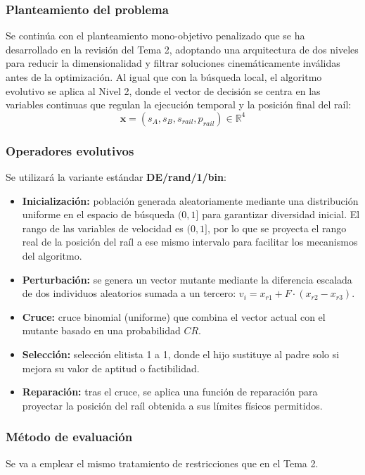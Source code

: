 \subsubsection*{Planteamiento del problema}
Se continúa con el planteamiento mono-objetivo penalizado que se ha desarrollado en la 
revisión del Tema 2, adoptando una
arquitectura de dos niveles para reducir la dimensionalidad y filtrar soluciones
cinemáticamente inválidas antes de la optimización. Al igual que con la búsqueda local,
el algoritmo evolutivo se aplica al Nivel 2, donde el vector de decisión se centra en las 
variables continuas que regulan la ejecución temporal y la posición final del raíl: 
\begin{equation}
    \mathbf{x} = (s_A, s_B, s_{rail}, p_{rail}) \in \mathbb{R}^4
\end{equation}

\subsubsection*{Operadores evolutivos}
Se utilizará la variante estándar \textbf{DE/rand/1/bin}:
\begin{itemize}
    \item \textbf{Inicialización:} población generada aleatoriamente mediante una 
distribución uniforme en el espacio de búsqueda $(0, 1]$ para garantizar diversidad inicial. 
El rango de las variables de velocidad es $(0, 1]$, por lo que se proyecta el rango real de la
posición del raíl a ese mismo intervalo para facilitar los mecanismos del algoritmo.
    \item \textbf{Perturbación:} se genera un vector mutante mediante la 
diferencia escalada de dos individuos aleatorios sumada a un tercero: $v_i = x_{r1} + F \cdot (x_{r2} - x_{r3})$.
    \item \textbf{Cruce:} cruce binomial (uniforme) que combina el vector 
actual con el mutante basado en una probabilidad $CR$.
    \item \textbf{Selección:} selección elitista 1 a 1, donde el hijo 
sustituye al padre solo si mejora su valor de aptitud o factibilidad.
    \item \textbf{Reparación:} tras el cruce, se aplica una función de reparación 
para proyectar la posición del raíl obtenida a sus límites físicos permitidos.
\end{itemize}

\subsubsection*{Método de evaluación}
Se va a emplear el mismo tratamiento de restricciones que en el Tema 2. 

